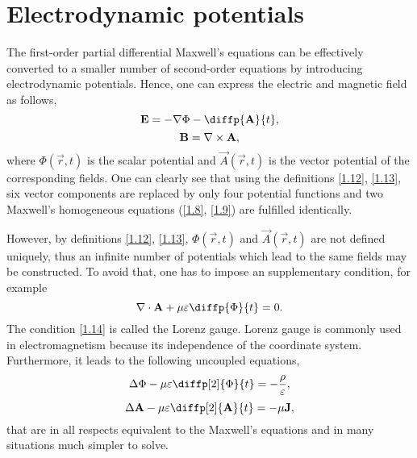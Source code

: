 \section{Electrodynamic potentials}
The first-order partial differential Maxwell's equations can be effectively converted to a smaller number of second-order equations by introducing electrodynamic potentials. Hence, one can express the electric and magnetic field as follows,
\begin{equation}
\label{1.12}
\vec{E} = -\grad{\Phi} - \diffp{\vec{A}}{t},
\end{equation}
\begin{equation}
\label{1.13}
\mathbf{B} = \nabla \times \mathbf{A},
\end{equation}
where $ \Phi\left(\vec{r}, t \right) $ is the scalar potential and $ \vec{A}\left(\vec{r}, t \right) $ is the vector potential of the corresponding fields. One can clearly see that using the definitions \ref{1.12}, \ref{1.13}, six vector components are replaced by only four potential functions and two Maxwell's homogeneous equations (\ref{1.8}, \ref{1.9}) are fulfilled identically. 

However, by definitions \ref{1.12}, \ref{1.13}, $ \Phi\left(\vec{r}, t \right) $ and $ \vec{A}\left(\vec{r}, t \right) $ are not defined uniquely, thus an infinite number of potentials which lead to the same fields may be constructed. To avoid that, one has to impose an supplementary condition, for example
\begin{equation}
\label{1.14}
\div{\vec{A}} + \mu \varepsilon \diffp{\Phi}{t} = 0.
\end{equation}
The condition \ref{1.14} is called the Lorenz gauge. Lorenz gauge is commonly used in electromagnetism because its independence of the coordinate system. Furthermore, it leads to the following uncoupled equations,
\begin{equation}
\label{1.15}
\laplace{\Phi} - \mu \varepsilon \diffp[2]{\Phi}{t} = -\frac{\rho}{\varepsilon},
\end{equation}
\begin{equation}
\label{1.16}
\laplace{\vec{A}} - \mu \varepsilon \diffp[2]{\vec{A}}{t} = -\mu \vec{J},
\end{equation}
that are in all respects equivalent to the Maxwell's equations and in many situations much simpler to solve.


